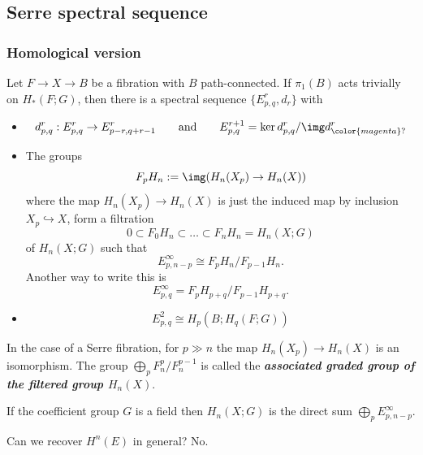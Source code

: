 \begin{remark}
\begin{defn}
\subsection{Serre spectral sequence}

\subsubsection{Homological version}

\begin{thm}
	Let $F\to X\to B$ be a fibration with $B$ path-connected. If $\pi_1(B)$ acts trivially on $H_*(F;G)$, then there is a spectral sequence $\{E^r_{p,q},d_r\}$ with
	\begin{itemize}
		\item
			\[d^r_{p,q}:E^r_{p,q}\to E^r_{p-r,q+r-1}\qquad \text{and} \qquad E^{r+1}_{p,q}=\ker d^r_{p,q}/\img d^r_{{\color{magenta}?}}\]
		\item The groups
			\[F_pH_n:=\img(H_n(X_p)\to H_n(X))\]
		where the map $H_{n}(X_p)\to H_{n}(X)$ is just the induced map by inclusion $X_p\hookrightarrow X$, form a filtration
		\[0\subset F_0H_n\subset \ldots\subset F_nH_n=H_n(X;G)\]
		of $H_n(X;G)$ such that
		\[E^\infty_{p,n-p}\cong F_pH_n/F_{p-1}H_n.\]
		Another way to write this is
		\[E_{p,q}^\infty=F_pH_{p+q}\Big/F_{p-1}H_{p+q}.\]
	\item \[E^2_{p,q}\cong H_p(B;H_q(F;G))\]
\end{itemize}
\end{thm}

\begin{remark}
	In the case of a Serre fibration, for $p\gg n$ the map $H_{n}(X_p)\to H_{n}(X)$ is an isomorphism. The group $\bigoplus_{p}F^p_n/F^{p-1}_n$ is called the \textit{\textbf{associated graded group of the filtered group $H_n(X)$}}.
\end{remark}

\begin{remark}
	If the coefficient group $G$ is a field then $H_{n}(X;G)$ is the direct sum $\bigoplus_{p} E^\infty_{p,n-p}$.
\end{remark}

\begin{question}
	Can we recover $H^{n}(E)$ in general? No.
\end{question}


\end{defn}
\end{remark}
